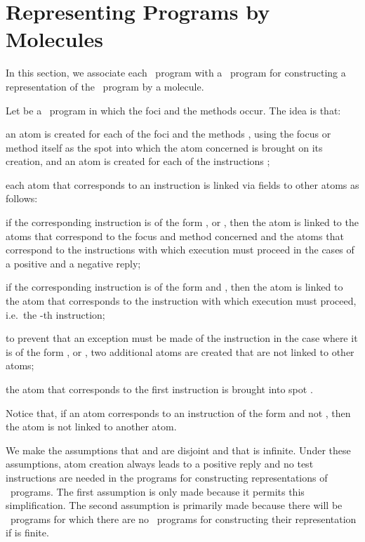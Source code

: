 \documentclass[fleqn]{llncs}
\begin{document}
\section{Representing Programs by Molecules}
\label{sect-representation}

In this section, we associate each \PGLD\ program with a \PGA\ program
for constructing a representation of the \PGLD\ program by a molecule.

Let  be a \PGLD\ program in which the foci
 and the methods  occur.
The idea is that:
\begin{iteml}
\item
an atom is created for each of the foci  and the methods
, using the focus or method itself as the spot into
which the atom concerned is brought on its creation, and an atom is
created for each of the instructions ;
\item
each atom that corresponds to an instruction is linked via fields to
other atoms as follows:
\begin{iteml}
\item
if the corresponding instruction is of the form ,  or
, then the atom is linked to the atoms that correspond to
the focus and method concerned and the atoms that correspond to the
instructions with which execution must proceed in the cases of a positive
and a negative reply;
\item
if the corresponding instruction is of the form  and
, then the atom is linked to the atom that corresponds
to the instruction with which execution must proceed, i.e.\ the -th
instruction;
\end{iteml}
\item
to prevent that an exception must be made of the instruction  in
the case where it is of the form ,  or ,
two additional atoms are created that are not linked to other atoms;
\item
the atom that corresponds to the first instruction is brought into spot
.
\end{iteml}
Notice that, if an atom corresponds to an instruction of the form
 and not , then the atom is not linked to
another atom.

We make the assumptions that  and  are disjoint and that
 is infinite.
Under these assumptions, atom creation always leads to a positive reply
and no test instructions are needed in the programs for constructing
representations of \PGLD\ programs.
The first assumption is only made because it permits this
simplification.
The second assumption is primarily made because there will be \PGLD\
programs for which there are no \PGA\ programs for constructing their
representation if  is finite.
\end{document}
